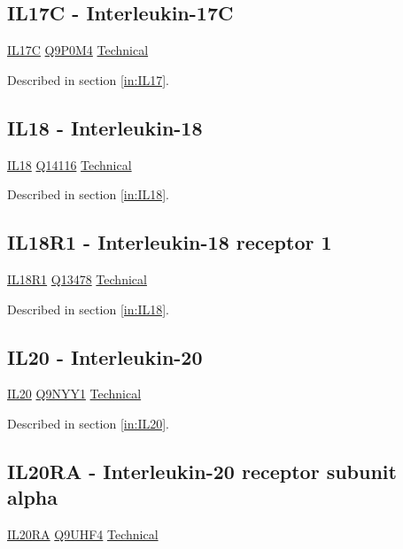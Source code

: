 \subsection{IL17C - Interleukin-17C}

\href{https://en.wikipedia.org/wiki/Interleukin_17}{IL17C}
\href{http://www.uniprot.org/uniprot/Q9P0M4}{Q9P0M4}
\href{https://olink.com/products-services/target/protein/?assayID=5075}{Technical}

Described in section \ref{in:IL17}.

\subsection{IL18 - Interleukin-18}

\href{https://en.wikipedia.org/wiki/Interleukin\_18}{IL18}
\href{http://www.uniprot.org/uniprot/Q14116}{Q14116}
\href{https://olink.com/products-services/target/protein/?assayID=5040}{Technical}

Described in section \ref{in:IL18}.

\subsection{IL18R1 - Interleukin-18 receptor 1}

\href{https://en.wikipedia.org/wiki/Interleukin-18\_receptor}{IL18R1}
\href{http://www.uniprot.org/uniprot/Q13478}{Q13478}
\href{https://olink.com/products-services/target/protein/?assayID=5056}{Technical}

Described in section \ref{in:IL18}.

\subsection{IL20 - Interleukin-20}

\href{https://en.wikipedia.org/wiki/Interleukin_20}{IL20}
\href{http://www.uniprot.org/uniprot/Q9NYY1}{Q9NYY1}
\href{https://olink.com/products-services/target/protein/?assayID=5091}{Technical}

Described in section \ref{in:IL20}.

\subsection{IL20RA - Interleukin-20 receptor subunit alpha}

\href{https://en.wikipedia.org/wiki/Interleukin_20_receptor,_alpha_subunit}{IL20RA}
\href{http://www.uniprot.org/uniprot/Q9UHF4}{Q9UHF4}
\href{https://olink.com/products-services/target/protein/?assayID=5080}{Technical}


